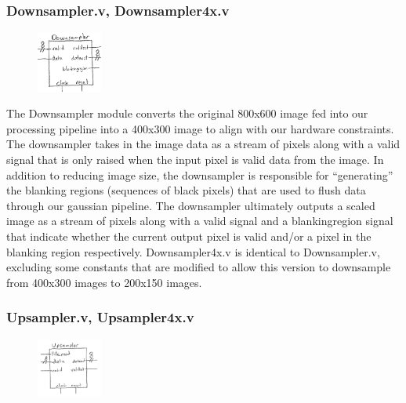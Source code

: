 \documentclass[12pt]{article}
\begin{document}
\subsubsection{Downsampler.v, Downsampler4x.v}

\begin{figure}
    \includegraphics[width=0.19\textwidth]{processed_image_pngs/black_box_modules/Downsampler_blackbox.png}
\end{figure}

The Downsampler module converts the original 800x600 image fed into our processing
pipeline into a 400x300 image to align with our hardware constraints. The downsampler
takes in the image data as a stream of pixels along with a valid signal that is
only raised when the input pixel is valid data from the image. In addition to 
reducing image size, the downsampler is responsible for ``generating'' the 
blanking regions (sequences of black pixels) that are used to flush data 
through our gaussian pipeline. The downsampler ultimately outputs a scaled 
image as a stream of pixels along with a valid signal and a blankingregion 
signal that indicate whether the current output pixel is valid and/or a pixel
in the blanking region respectively. Downsampler4x.v is identical to 
Downsampler.v, excluding some constants that are modified to allow this version 
to downsample from 400x300 images to 200x150 images.

\subsubsection{Upsampler.v, Upsampler4x.v}

\begin{figure}
    \includegraphics[width=0.19\textwidth]{processed_image_pngs/black_box_modules/Upsampler_blackbox.png}
\end{figure}
\end{document}
